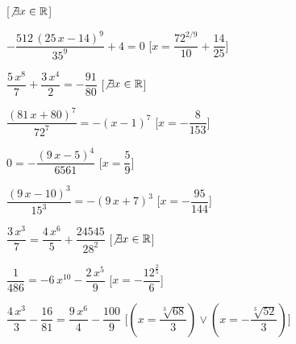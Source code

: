 \begin{esercizio}
\begin{enumeratea}
\hfill [\(\not\exists x \in \mathbb{R}\)]
\item \(-{\dfrac{512\, \left( 25\,x-14 \right) ^{9}}{35^9}}+4=0\) 
\hfill [\(x={\dfrac{7 {2}^{2/9}}{10}}+{\dfrac{14}{25}}\)]
\item \({\dfrac{5\,{x}^{8}}{7}}+{\dfrac{3\,{x}^{4}}{2}}=-{\dfrac
{91}{80}}\) 
\hfill [\(\not\exists x \in \mathbb{R}\)]
\item \({\dfrac{ \left( 81\,x+80 \right) ^{7}}{72^7}}=- \left( x-1 
\right) ^{7}\) 
\hfill [\(x=-{\dfrac{8}{153}}\)]
\item \(0=-{\dfrac{ \left( 9\,x-5 \right) ^{4}}{6561}}\) 
\hfill [\(x={\dfrac{5}{9}}\)]
\item \({\dfrac{ \left( 9\,x-10 \right) ^{3}}{15^3}}=- \left( 9\,x+7 
\right) 
^{3}\) 
\hfill [\(x=-{\dfrac{95}{144}}\)]
\item \({\dfrac{3\,{x}^{3}}{7}}={\dfrac{4\,{x}^{6}}{5}}+{\dfrac
{24545}{28^2}}\) 
\hfill [\(\not\exists x \in \mathbb{R}\)]
\item \({\dfrac{1}{486}}=-6\,{x}^{10}-{\dfrac{2\,{x}^{5}}{9}}\) 
\hfill [\(x=-{\dfrac{{12}^{{\frac{2}{5}}}}{6}}\)]
\item \({\dfrac{4\,{x}^{3}}{3}}-{\dfrac{16}{81}}={\dfrac
{9\,{x}^{6}}{4}}-{\dfrac{100}{9}}\) 
\hfill [\((x={\dfrac{\sqrt [3]{68}}{3}})\vee (x=-{\dfrac{\sqrt 
[3]{52}}{3}})\)]
\end{enumeratea}
\end{esercizio}

